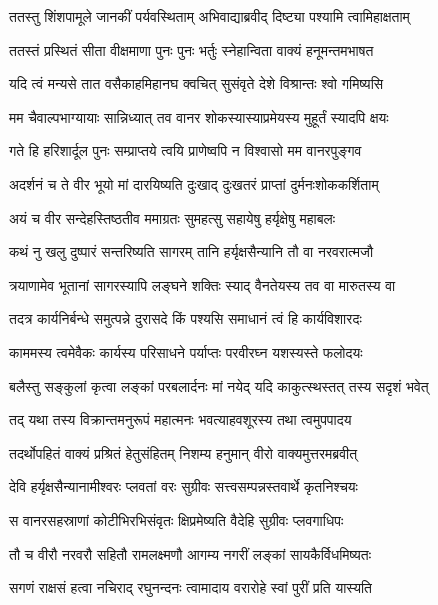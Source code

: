 
\twolineshloka
{ततस्तु शिंशपामूले जानकीं पर्यवस्थिताम्}
{अभिवाद्याब्रवीद् दिष्ट्या पश्यामि त्वामिहाक्षताम्} %

\twolineshloka
{ततस्तं प्रस्थितं सीता वीक्षमाणा पुनः पुनः}
{भर्तुः स्नेहान्विता वाक्यं हनूमन्तमभाषत} %

\twolineshloka
{यदि त्वं मन्यसे तात वसैकाहमिहानघ}
{क्वचित् सुसंवृते देशे विश्रान्तः श्वो गमिष्यसि} %

\twolineshloka
{मम चैवाल्पभाग्यायाः सान्निध्यात् तव वानर}
{शोकस्यास्याप्रमेयस्य मुहूर्तं स्यादपि क्षयः} %

\twolineshloka
{गते हि हरिशार्दूल पुनः सम्प्राप्तये त्वयि}
{प्राणेष्वपि न विश्वासो मम वानरपुङ्गव} %

\twolineshloka
{अदर्शनं च ते वीर भूयो मां दारयिष्यति}
{दुःखाद् दुःखतरं प्राप्तां दुर्मनःशोककर्शिताम्} %

\twolineshloka
{अयं च वीर सन्देहस्तिष्ठतीव ममाग्रतः}
{सुमहत्सु सहायेषु हर्यृक्षेषु महाबलः} %

\twolineshloka
{कथं नु खलु दुष्पारं सन्तरिष्यति सागरम्}
{तानि हर्यृक्षसैन्यानि तौ वा नरवरात्मजौ} %

\twolineshloka
{त्रयाणामेव भूतानां सागरस्यापि लङ्घने}
{शक्तिः स्याद् वैनतेयस्य तव वा मारुतस्य वा} %

\twolineshloka
{तदत्र कार्यनिर्बन्धे समुत्पन्ने दुरासदे}
{किं पश्यसि समाधानं त्वं हि कार्यविशारदः} %

\twolineshloka
{काममस्य त्वमेवैकः कार्यस्य परिसाधने}
{पर्याप्तः परवीरघ्न यशस्यस्ते फलोदयः} %

\twolineshloka
{बलैस्तु सङ्कुलां कृत्वा लङ्कां परबलार्दनः}
{मां नयेद् यदि काकुत्स्थस्तत् तस्य सदृशं भवेत्} %

\twolineshloka
{तद् यथा तस्य विक्रान्तमनुरूपं महात्मनः}
{भवत्याहवशूरस्य तथा त्वमुपपादय} %

\twolineshloka
{तदर्थोपहितं वाक्यं प्रश्रितं हेतुसंहितम्}
{निशम्य हनुमान् वीरो वाक्यमुत्तरमब्रवीत्} %

\twolineshloka
{देवि हर्यृक्षसैन्यानामीश्वरः प्लवतां वरः}
{सुग्रीवः सत्त्वसम्पन्नस्तवार्थे कृतनिश्चयः} %

\twolineshloka
{स वानरसहस्राणां कोटीभिरभिसंवृतः}
{क्षिप्रमेष्यति वैदेहि सुग्रीवः प्लवगाधिपः} %

\twolineshloka
{तौ च वीरौ नरवरौ सहितौ रामलक्ष्मणौ}
{आगम्य नगरीं लङ्कां सायकैर्विधमिष्यतः} %

\twolineshloka
{सगणं राक्षसं हत्वा नचिराद् रघुनन्दनः}
{त्वामादाय वरारोहे स्वां पुरीं प्रति यास्यति} %

